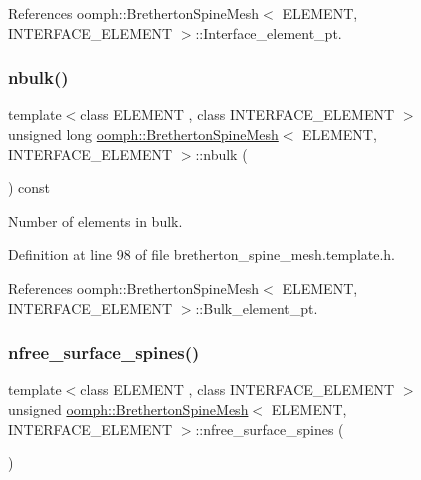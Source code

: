 References oomph\+::\+Bretherton\+Spine\+Mesh$<$ E\+L\+E\+M\+E\+N\+T, I\+N\+T\+E\+R\+F\+A\+C\+E\+\_\+\+E\+L\+E\+M\+E\+N\+T $>$\+::\+Interface\+\_\+element\+\_\+pt.

\mbox{\label{classoomph_1_1BrethertonSpineMesh_a47184866746a1fce6dd0ca27ab7e17ce}} 
\subsubsection{\texorpdfstring{nbulk()}{nbulk()}}
{\footnotesize\ttfamily template$<$class E\+L\+E\+M\+E\+NT , class I\+N\+T\+E\+R\+F\+A\+C\+E\+\_\+\+E\+L\+E\+M\+E\+NT $>$ \\
unsigned long \hyperlink{classoomph_1_1BrethertonSpineMesh}{oomph\+::\+Bretherton\+Spine\+Mesh}$<$ E\+L\+E\+M\+E\+NT, I\+N\+T\+E\+R\+F\+A\+C\+E\+\_\+\+E\+L\+E\+M\+E\+NT $>$\+::nbulk (\begin{DoxyParamCaption}{ }\end{DoxyParamCaption}) const\hspace{0.3cm}{\ttfamily [inline]}}



Number of elements in bulk. 



Definition at line 98 of file bretherton\+\_\+spine\+\_\+mesh.\+template.\+h.



References oomph\+::\+Bretherton\+Spine\+Mesh$<$ E\+L\+E\+M\+E\+N\+T, I\+N\+T\+E\+R\+F\+A\+C\+E\+\_\+\+E\+L\+E\+M\+E\+N\+T $>$\+::\+Bulk\+\_\+element\+\_\+pt.

\mbox{\label{classoomph_1_1BrethertonSpineMesh_ade4d0f2933beddda517b949d80928a18}} 
\subsubsection{\texorpdfstring{nfree\+\_\+surface\+\_\+spines()}{nfree\_surface\_spines()}}
{\footnotesize\ttfamily template$<$class E\+L\+E\+M\+E\+NT , class I\+N\+T\+E\+R\+F\+A\+C\+E\+\_\+\+E\+L\+E\+M\+E\+NT $>$ \\
unsigned \hyperlink{classoomph_1_1BrethertonSpineMesh}{oomph\+::\+Bretherton\+Spine\+Mesh}$<$ E\+L\+E\+M\+E\+NT, I\+N\+T\+E\+R\+F\+A\+C\+E\+\_\+\+E\+L\+E\+M\+E\+NT $>$\+::nfree\+\_\+surface\+\_\+spines (\begin{DoxyParamCaption}{ }\end{DoxyParamCaption})\hspace{0.3cm}{\ttfamily [inline]}}

